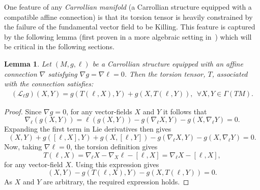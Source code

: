 \documentclass{article}
\newtheorem{lemma}[theorem]{Lemma}
\theoremstyle{definition}
\theoremstyle{remark}
\begin{document}
One feature of any \textit{Carrollian manifold} (a Carrollian structure equipped with a compatible affine connection) is that its torsion tensor is heavily constrained by the failure of the fundamental vector field to be Killing. This feature is captured by the following lemma (first proven in a more algebraic setting in~\cite{figueroa2020intrinsic})
which will be critical in the following sections.

\begin{lemma} \label{thm:CarrollianConnection}
    Let $(M,g, \ell)$ be a Carrollian structure equipped with an affine connection $\nabla$ satisfying $\nabla g = \nabla \ell = 0$. Then the torsion tensor, $T$, associated with the connection satisfies: 
    \begin{align} \label{uniqueTorsion}
        (\mathcal{L}_{\ell} g)(X,Y) = g(T(\ell,X), Y)  + g( X, T(\ell,Y)), ~~\forall X,Y \in \Gamma(T M).
    \end{align}
\end{lemma}

\begin{proof}
    Since $\nabla g = 0$, for any vector-fields $X$ and $Y$ it follows that
    \begin{equation}
        \nabla_{\ell} (g(X,Y)) = \ell (g(X,Y)) - g (\nabla_{\ell} X, Y) - g(X,\nabla_{\ell} Y)=0. 
    \end{equation}
    Expanding the first term in Lie derivatives then gives
    \begin{equation}
        [\mathcal{L}_{\ell}g](X,Y)+g([\ell, X], Y)+ g(X, [\ell, Y]) - g (\nabla_{\ell} X, Y) - g(X,\nabla_{\ell} Y)=0.
    \end{equation}
    Now, taking $\nabla \ell =0$, the torsion definition gives
    \begin{equation}
        T(\ell, X) = \nabla_{\ell} X - \nabla_X \ell - [\ell, X] = \nabla_{\ell} X - [\ell, X], \nonumber
    \end{equation}
    \noindent for any vector-field $X$. Using this expression gives
    \begin{equation}
        [\mathcal{L}_{\ell}g](X,Y) - g(T(\ell, X), Y) - g(X, T(\ell, Y)) =0. 
    \end{equation}
    As $X$ and $Y$ are arbitrary, the required expression holds.
\end{proof}
\end{document}
